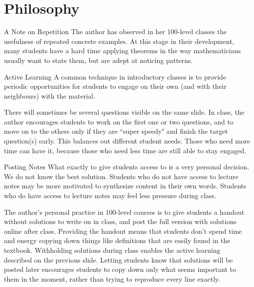 \documentclass[10pt]{beamer}
\begin{document}
\section{Philosophy}
\frame{\tableofcontents[currentsection]}
\begin{frame}{A Note on Repetition}
The author has observed in her 100-level classes the usefulness of repeated concrete examples. At this stage in their development, many students have a hard time applying theorems in the way mathematicians usually want to state them, but are adept at noticing patterns.\end{frame}
\begin{frame}{Active Learning}
A common technique in introductory classes is to provide periodic opportunities for students to engage on their own (and with their neighbours) with the material. \vfill

There will sometimes be several questions visible on the same slide. In class, the author encourages students to work on the first one or two questions, and to move on to the others only if they are ``super speedy" and finish the target question(s) early. This balances out different student needs. Those who need more time can have it, because those who need less time are still able to stay engaged.
\end{frame}
\begin{frame}{Posting Notes}
What exactly to give students access to is a very personal decision.  We do not know the best solution. Students who do not have access to lecture notes may be more motivated to synthesize content in their own words. Students who do have access to lecture notes may feel less pressure during class. 
\vfill

The author's personal practice in 100-level courses is to give students a handout without solutions to write on in class, and post the full version with solutions online after class. Providing the handout means that students don't spend time and energy copying down things like definitions that are easily found in the textbook. Withholding solutions during class enables the active learning described on the previous slide. Letting students know that solutions will be posted later encourages students to copy down only what seems important to them in the moment, rather than trying to reproduce every line exactly.
\end{frame}
\end{document}
